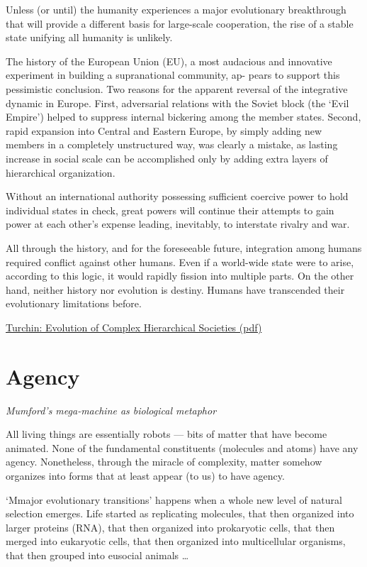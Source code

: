 \documentclass[
]{book}
\begin{document}
Unless (or until) the humanity experiences a major evolutionary breakthrough
that will provide a different basis for large-scale cooperation,
the rise of a stable state unifying all humanity is unlikely.

The history of the European Union (EU), a most audacious and
innovative experiment in building a supranational community, ap-
pears to support this pessimistic conclusion.
Two reasons for the apparent
reversal of the integrative dynamic in Europe. First, adversarial
relations with the Soviet block (the `Evil Empire') helped to suppress internal
bickering among the member states.
Second, rapid expansion into Central and Eastern Europe,
by simply adding new members in a completely unstructured way,
was clearly a mistake,
as lasting increase in social scale can be accomplished only by
adding extra layers of hierarchical organization.

Without an international authority possessing sufficient coercive power to hold
individual states in check, great powers will continue their attempts
to gain power at each other's expense leading, inevitably, to
interstate rivalry and war.

All through the history, and for the
foreseeable future, integration among humans required conflict
against other humans. Even if a world-wide state were to arise,
according to this logic, it would rapidly fission into multiple parts.
On the other hand, neither history nor evolution is destiny. Humans
have transcended their evolutionary limitations before.

\href{pdf/Turchin_Evolution_of_complex_hierarchical_societies.pdf}{Turchin: Evolution of Complex Hierarchical Societies (pdf)}

\hypertarget{agency}{%
\chapter{Agency}\label{agency}}

\emph{Mumford's mega-machine as biological metaphor}

All living things are essentially robots --- bits of matter that have become animated. None of the fundamental constituents (molecules and atoms) have any agency. Nonetheless, through the miracle of complexity, matter somehow organizes into forms that at least appear (to us) to have agency.

`Mmajor evolutionary transitions' happens when a whole new level of natural selection emerges. Life started as replicating molecules, that then organized into larger proteins (RNA), that then organized into prokaryotic cells, that then merged into eukaryotic cells, that then organized into multicellular organisms, that then grouped into eusocial animals \ldots{}
\end{document}
